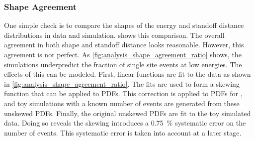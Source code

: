 \documentclass[herrin-thesis.tex]{subfiles}
\begin{document}
\subsubsection{Shape Agreement}
\label{sec:analysis_shape_agreement}
One simple check is to compare the shapes of the energy and standoff distance distributions in data and simulation.  shows this comparison. The overall agreement in both shape and standoff distance looks reasonable. However, this agreement is not perfect. As \cref{fig:analysis_shape_agreement_ratio} shows, the simulations underpredict the fraction of single site events at low energies. The effects of this can be modeled. First, linear functions are fit to the data as shown in \cref{fig:analysis_shape_agreement_ratio}. The fits are used to form a skewing function that can be applied to PDFs. This correction is applied to PDFs for \twonu{}, and toy simulations with a known number of \twonu{} events are generated from these unskewed PDFs. Finally, the original unskewed PDFs are fit to the toy simulated data. Doing so reveals the skewing introduces a \SI{0.75}{\percent} systematic error on the number of \twonu{} events. This systematic error is taken into account at a later stage.
\end{document}
